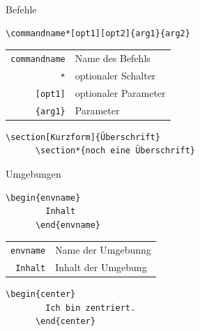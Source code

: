 \begin{Frame}[fragile]{Befehle}
  \begin{Definition}[Befehl]
    \begin{lstlisting}[gobble=6,backgroundcolor={},frame=no,morekeywords={commandname}]
      \commandname*[opt1][opt2]{arg1}{arg2}
    \end{lstlisting}

    \begin{tabular}{rl}
      \lstinline[morekeywords={commandname}]-commandname- & Name des Befehls \\
      \lstinline-*- & optionaler Schalter \\
      \lstinline-[opt1]- & optionaler Parameter \\
      \lstinline-{arg1}- & Parameter
    \end{tabular}
  \end{Definition}

  \xxx

  \begin{Beispiel}[Befehl]
    \begin{lstlisting}[gobble=6,backgroundcolor={},frame=no]
      \section[Kurzform]{Überschrift}
      \section*{noch eine Überschrift}
    \end{lstlisting}
  \end{Beispiel}
\end{Frame}

\begin{Frame}[fragile]{Umgebungen}
  \begin{Definition}[Umgebung]
    \begin{lstlisting}[gobble=6,backgroundcolor={},frame=no]
      \begin{envname}
        Inhalt
      \end{envname}
    \end{lstlisting}

    \begin{tabular}{rl}
      \lstinline-envname- & Name der Umgebunng \\
      \lstinline-Inhalt- & Inhalt der Umgebung
    \end{tabular}
  \end{Definition}

  \xxx

  \begin{Beispiel}[Umgebung]
    \begin{lstlisting}[gobble=6,backgroundcolor={},frame=no]
      \begin{center}
        Ich bin zentriert.
      \end{center}
    \end{lstlisting}
  \end{Beispiel}
\end{Frame}

